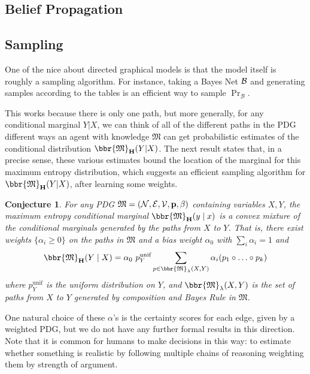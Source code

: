 \documentclass{article}
\theoremstyle{plain}
\newtheorem{conj}[theorem]{Conjecture}
\theoremstyle{definition}
\theoremstyle{remark}
\newcommand\MaxEnt{_{\mathbf H}}
\newcommand{\dg}[1]{\mathfrak{#1}}
\newcommand{\MN}{PDG}
\numberwithin{equation}{section}
\begin{document}
{\begin{vfull}
	\subsection{Belief Propagation}
	
	
	\subsection{Sampling}
	
	One of the nice about directed graphical models is that the model itself is roughly a sampling algorithm. For instance, taking a Bayes Net $\cal B$ and generating samples according to the tables is an efficient way to sample $\Pr_{\mathcal B}$.

	This works because there is only one path, but more generally, for any conditional marginal $Y|X$, we can think of all of the different paths in the PDG different ways an agent with knowledge $\dg M$ can get probabilistic estimates of the conditional distribution $\bbr{\dg M}\MaxEnt(Y | X)$. The next result states that, in a precise sense, these various estimates bound the location of the marginal for this maximum entropy distribution, which suggests an efficient sampling algorithm for $\bbr{\dg M}\MaxEnt(Y | X)$, after learning some weights.
	
	\begin{conj}\label{thm:maxent-hull}
		For any PDG $\dg M = \mnvars[]$ containing variables $X, Y$, the maximum entropy conditional marginal $\bbr{\dg M}\MaxEnt(y \mid x)$ is a convex mixture of the conditional marginals generated by the paths from $X$ to $Y$.  That is, there exist weights $\{\alpha_i \geq 0\}$ on the paths in $\dg M$ and a bias weight $\alpha_0$ with $\sum_i {\alpha_i} = 1$ and
		\[ \bbr{\dg M}\MaxEnt(Y \mid X) = \alpha_0 \  p^{\text{unif}}_Y \sum_{p \in \bbr{\dg M}_\lambda(X, Y)} \alpha_i (p_1 \circ \ldots \circ p_k) \]
		where $p^{\text{unif}}_Y$ is the uniform distribution on $Y$, and $\bbr{\dg M}_\lambda(X,Y)$ is the set of paths from $X$ to $Y$ generated by composition and Bayes Rule in $\dg M$. 
	\end{conj}

	One natural choice of these $\alpha$'s is the certainty scores for each edge, given by a weighted \MN, but we do not have any further formal results in this direction.
	Note that it is common for humans to make decisions in this way: to estimate whether something is realistic by following multiple chains of reasoning weighting them by strength of argument.
	
	\end{vfull}
}
\end{document}
